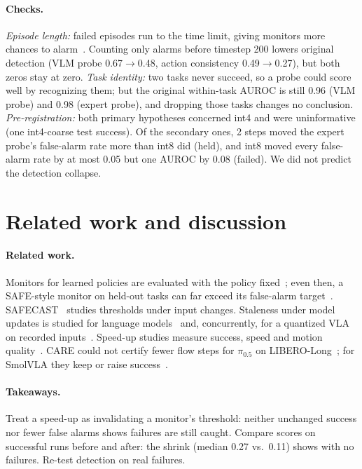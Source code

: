 \documentclass{article}
\begin{document}
\paragraph{Checks.} \emph{Episode length:} failed episodes run to the time limit, giving monitors
more chances to alarm~\citep{rankpreserving}. Counting only alarms before timestep 200 lowers
original detection (VLM probe 0.67$\rightarrow$0.48, action consistency 0.49$\rightarrow$0.27),
but both zeros stay at zero. \emph{Task identity:} two tasks never succeed, so a probe could score
well by recognizing them; but the original within-task AUROC is still 0.96 (VLM probe) and 0.98
(expert probe), and dropping those tasks changes no conclusion. \emph{Pre-registration:} both
primary hypotheses concerned int4 and were uninformative (one int4-coarse test success). Of the
secondary ones, 2 steps moved the expert probe's false-alarm rate more than int8 did (held), and
int8 moved every false-alarm rate by at most 0.05 but one AUROC by 0.08 (failed). We did not predict the detection collapse.

\section{Related work and discussion}

\paragraph{Related work.} Monitors for learned policies are evaluated with the
policy fixed~\citep{safe,vlafail,fiper,sentinel}; even then, a SAFE-style monitor on held-out tasks can
far exceed its false-alarm target~\citep{rescue}. SAFECAST~\citep{safecast} studies
thresholds under input changes. Staleness under model updates is
studied for language models~\citep{duan,doula} and, concurrently, for a quantized VLA on
recorded inputs~\citep{rankpreserving}. Speed-up studies
measure success, speed and motion quality~\citep{vlaquantbench,quantvla,embodiedeff}. CARE could
not certify fewer flow steps for $\pi_{0.5}$ on LIBERO-Long~\citep{care}; for SmolVLA they
keep or raise success~\citep{onestep}.

\paragraph{Takeaways.} Treat a speed-up as invalidating a monitor's threshold: neither
unchanged success nor fewer false alarms shows failures are still caught. Compare scores
on successful runs before and after: the shrink (median 0.27 vs.\ 0.11) shows with no failures.
Re-test detection on real failures.
\end{document}

